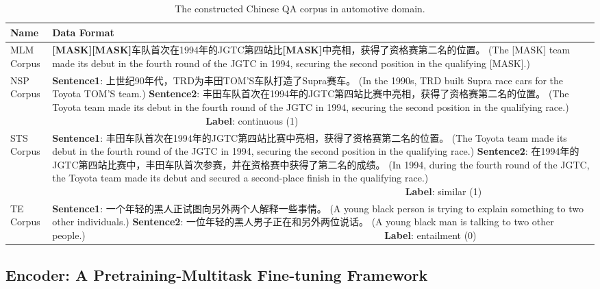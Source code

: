 \documentclass[mathematics,article,submit,moreauthors]{Definitions/mdpi}
\newcommand{\1}[1]{\mathds{1}\left[#1\right]}
\begin{document}
\begin{table}[H] 
	\caption{The constructed Chinese QA corpus in automotive domain.} \label{tab:annotated_corpus}
	\begin{tabularx}{\textwidth}{p{2cm}L} 
		\toprule
		\textbf{Name}  & \textbf{Data Format}	\\
		\midrule
		MLM Corpus  & \textbf{[MASK][MASK]}车队首次在1994年的JGTC第四站比\textbf{[MASK]}中亮相，获得了资格赛第二名的位置。{\color{blue} (The [MASK] team made its debut in the fourth round of the JGTC  in 1994, securing the second position in the qualifying [MASK].) } \\
		\midrule
		NSP Corpus  & \textbf{Sentence1}: 上世纪90年代，TRD为丰田TOM'S车队打造了Supra赛车。{\color{blue} (In the 1990s, TRD built Supra race cars for the Toyota TOM'S team.) }
		\textbf{Sentence2}: 丰田车队首次在1994年的JGTC第四站比赛中亮相，获得了资格赛第二名的位置。{\color{blue} (The Toyota team made its debut in the fourth round of the JGTC  in 1994, securing the second position in the qualifying race.)} ~~~~~~~~~~~~~~~~~~~~~~~~~~~~~~~~\textbf{Label}: continuous (1)\\
		\midrule
		STS Corpus & \textbf{Sentence1}: 丰田车队首次在1994年的JGTC第四站比赛中亮相，获得了资格赛第二名的位置。{\color{blue} (The Toyota team made its debut in the fourth round of the JGTC  in 1994, securing the second position in the qualifying race.)}
		\textbf{Sentence2}: 在1994年的JGTC第四站比赛中，丰田车队首次参赛，并在资格赛中获得了第二名的成绩。{\color{blue} (In 1994, during the fourth round of the JGTC, the Toyota team made its debut and secured a second-place finish in the qualifying race.)} ~~~~~~~~~~~~~~~~~~~~~~~~~~~~~~~~~~~~~~~~~~~~~~~~~~~~~~~~~~~~~~~~~~~~~~~~~ \textbf{Label}: similar (1) ~~~~~~~~		\\
		\midrule
		TE Corpus  &  \textbf{Sentence1}: 一个年轻的黑人正试图向另外两个人解释一些事情。{\color{blue} (A young black person is trying to explain something to two other individuals.)}
		\textbf{Sentence2}: 一位年轻的黑人男子正在和另外两位说话。{\color{blue} (A young black man is talking to two other people.)} ~~~~~~~~~~~~~~~~~~~~~~~~~~~~~~~~~~~~~~~~~~~~~~~~~~~~~~~~~~~~~ \textbf{Label}: entailment (0) ~~~~~		\\
		\bottomrule
	\end{tabularx}
\end{table}

\subsection{Encoder: A Pretraining-Multitask Fine-tuning Framework}
\label{sec:encoder}
\end{document}
